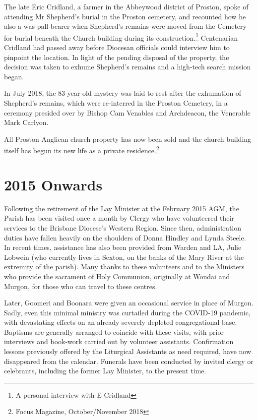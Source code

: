 The late Eric Cridland, a farmer in the Abbeywood district of Proston, spoke of attending Mr Shepherd's burial in the Proston cemetery, and recounted how he also a was pall-bearer when Shepherd's remains were moved from the Cemetery for burial beneath the Church building during its construction.\footnote{A personal interview with E Cridland} Centenarian Cridland had passed away before Diocesan officials could interview him to pinpoint the location. In light of the pending disposal of the property, the decision was taken to exhume Shepherd's remains and a high-tech search mission began.


In July 2018, the 83-year-old mystery was laid to rest after the exhumation of Shepherd's remains, which were re-interred in the Proston Cemetery, in a ceremony presided over by Bishop Cam Venables and Archdeacon, the Venerable Mark Carlyon.



All Proston Anglican church property has now been sold and the church building itself has begun its new life as a private residence.\footnote{Focus Magazine, October/November 2018}


\section{2015 Onwards}



Following the retirement of the Lay Minister at the February 2015 AGM, the Parish has been visited once a month by Clergy who have volunteered their services to the Brisbane Diocese's Western Region. Since then, administration duties have fallen heavily on the shoulders of Donna Hindley and Lynda Steele. In recent times, assistance has also been provided from Warden and LA, Julie Lobwein (who currently lives in Sexton, on the banks of the Mary River at the extremity of the parish). Many thanks to these volunteers and to the Ministers who provide the sacrament of Holy Communion, originally at Wondai and Murgon, for those who can travel to these centres.



Later, Goomeri and Boonara were given an occasional service in place of Murgon. Sadly, even this minimal ministry was curtailed during the COVID-19 pandemic, with devastating effects on an already severely depleted congregational base. Baptisms are generally arranged to coincide with these visits, with prior interviews and book-work carried out by volunteer assistants. Confirmation lessons previously offered by the Liturgical Assistants as need required, have now disappeared from the calendar. Funerals have been conducted by invited clergy or celebrants, including the former Lay Minister, to the present time.



